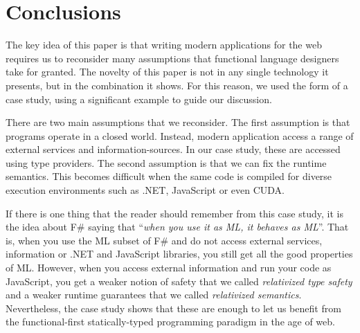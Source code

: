 \documentclass[submission,copyright,creativecommons]{eptcs}
\begin{document}
\section{Conclusions}

The key idea of this paper is that writing modern applications for the web requires us to
reconsider many assumptions that functional language designers take for granted. The novelty
of this paper is not in any single technology it presents, but in the combination it shows.
For this reason, we used the form of a case study, using a significant example to guide our
discussion.

There are two main assumptions that we reconsider. The first assumption is that programs
operate in a closed world. Instead, modern application access a range of external services
and information-sources. In our case study, these are accessed using type providers.
The second assumption is that we can fix the runtime semantics. This becomes difficult when
the same code is compiled for diverse execution environments such as .NET, JavaScript or
even CUDA.

If there is one thing that the reader should remember from this case study, it is the
idea about F\# saying that ``\emph{when you use it as ML, it behaves as ML}''. That is, when
you use the ML subset of F\# and do not access external services, information or .NET and
JavaScript libraries, you still get all the good properties of ML. However, when you access
external information and run your code as JavaScript, you get a weaker notion of safety that
we called \emph{relativized type safety} and a weaker runtime guarantees that we called
\emph{relativized semantics}. Nevertheless, the case study shows that these are enough to
let us benefit from the functional-first statically-typed programming paradigm in the age of web.
\newpage


\nocite{*}


\end{document}
